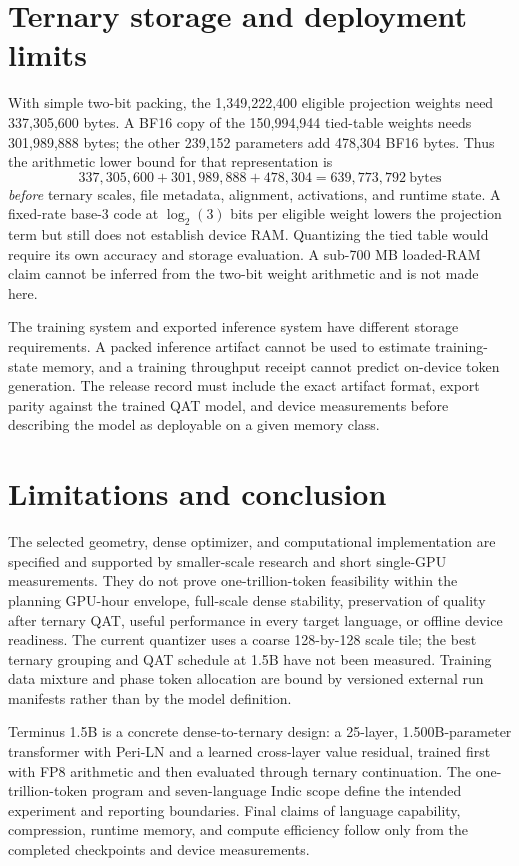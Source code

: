 \documentclass[11pt]{article}
\newcommand{\model}{Terminus 1.5B}
\begin{document}
\section{Ternary storage and deployment limits}

With simple two-bit packing, the 1,349,222,400 eligible projection weights
need 337,305,600 bytes. A BF16 copy of the 150,994,944 tied-table weights
needs 301,989,888 bytes; the other 239,152 parameters add 478,304 BF16
bytes. Thus the arithmetic lower bound for that representation is
\begin{equation}
337{,}305{,}600+301{,}989{,}888+478{,}304
=639{,}773{,}792\ \text{bytes}
\end{equation}
\emph{before} ternary scales, file metadata, alignment, activations, and
runtime state. A fixed-rate base-3 code at $\log_2(3)$ bits per eligible
weight lowers the projection term but still does not establish device RAM.
Quantizing the tied table would require its own accuracy and storage
evaluation. A sub-700 MB loaded-RAM claim cannot be inferred from the
two-bit weight arithmetic and is not made here.

The training system and exported inference system have different storage
requirements. A packed inference artifact cannot be used to estimate
training-state memory, and a training throughput receipt cannot predict
on-device token generation. The release record must include the exact
artifact format, export parity against the trained QAT model, and device
measurements before describing the model as deployable on a given memory
class.

\section{Limitations and conclusion}

The selected geometry, dense optimizer, and computational implementation
are specified and supported by smaller-scale research and short single-GPU
measurements. They do not prove one-trillion-token feasibility within the
planning GPU-hour envelope, full-scale dense stability, preservation of
quality after ternary QAT, useful performance in every target language,
or offline device readiness. The current quantizer uses a coarse
128-by-128 scale tile; the best ternary grouping and QAT schedule at
1.5B have not been measured. Training data mixture and phase token
allocation are bound by versioned external run manifests rather than by
the model definition.

\model{} is a concrete dense-to-ternary design: a 25-layer,
1.500B-parameter transformer with Peri-LN and a learned cross-layer value
residual, trained first with FP8 arithmetic and then evaluated through
ternary continuation. The one-trillion-token program and seven-language
Indic scope define the intended experiment and reporting boundaries.
Final claims of language capability, compression, runtime memory, and
compute efficiency follow only from the completed checkpoints and device
measurements.
\end{document}

